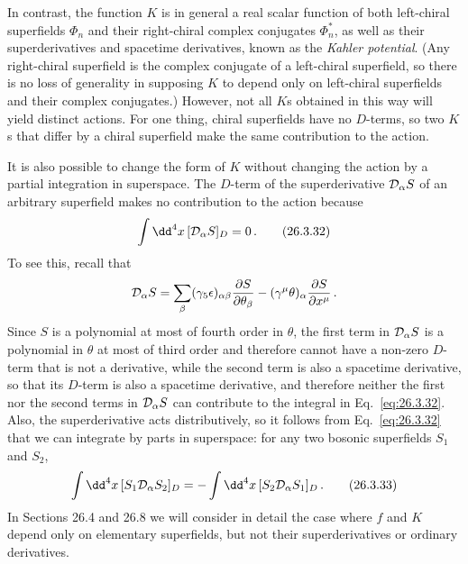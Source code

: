 In contrast, the function $K$ is in general a real scalar function of both
left-chiral superfields $\Phi_n$ and their right-chiral complex conjugates
$\Phi_n^*$, as well as their superderivatives and spacetime derivatives,
known as the \emph{Kahler potential}. (Any right-chiral superfield is the
complex conjugate of a left-chiral superfield, so there is no loss of
generality in supposing $K$ to depend only on left-chiral superfields and
their complex conjugates.) However, not all $K$s obtained in this way will
yield distinct actions. For one thing, chiral superfields have no $D$-terms,
so two $K$s that differ by a chiral superfield make the same contribution to
the action.

It is also possible to change the form of $K$ without changing the action by a
partial integration in superspace. The $D$-term of the superderivative
$\mathcal{D}_\alpha S$ of an arbitrary superfield makes no contribution to the
action because
\begin{equation}
  \int \dd^4x\,[\SuperD_\alpha S]_D=0\,.
  \tag{26.3.32}\label{eq:26.3.32}
\end{equation}
To see this, recall that
\[
  \mathcal{D}_\alpha S
  =\sum_\beta(\gamma_5\epsilon)_{\alpha\beta}
    \frac{\partial S}{\partial\theta_\beta}
  -(\gamma^\mu\theta)_\alpha\frac{\partial S}{\partial x^\mu}\,.
\]
Since $S$ is a polynomial at most of fourth order in $\theta$, the first term
in $\mathcal{D}_\alpha S$ is a polynomial in $\theta$ at most of third order and
therefore cannot have a non-zero $D$-term that is not a derivative, while the
second term is also a spacetime derivative, so that its $D$-term is also a
spacetime derivative, and therefore neither the first nor the second terms in
$\mathcal{D}_\alpha S$ can contribute to the integral in
Eq.~\eqref{eq:26.3.32}. Also, the superderivative acts distributively, so it
follows from Eq.~\eqref{eq:26.3.32} that we can integrate by parts in
superspace: for any two bosonic superfields $S_1$ and $S_2$,
\begin{equation}
  \int \dd^4x\,[S_1\SuperD_\alpha S_2]_D
  =-\int \dd^4x\,[S_2\SuperD_\alpha S_1]_D\,.
  \tag{26.3.33}\label{eq:26.3.33}
\end{equation}
In Sections 26.4 and 26.8 we will consider in detail the case where $f$ and
$K$ depend only on elementary superfields, but not their superderivatives or
ordinary derivatives.


